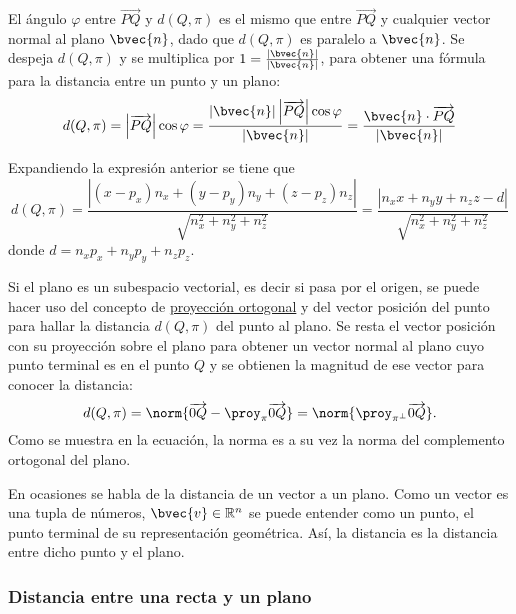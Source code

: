 \documentclass{fmbnotes}
\begin{document}
El ángulo \( \varphi \) entre \( \overrightarrow{P Q} \) y \( d(Q, \pi) \) es el mismo que entre \( \overrightarrow{P Q} \) y cualquier vector normal al plano \( \bvec{n} \), dado que \( d(Q, \pi) \) es paralelo a \( \bvec{n}  \). Se despeja \( d(Q, \pi) \) y se multiplica por \( 1=\frac{\left|\bvec{n}\right|}{\left|\bvec{n}\right|} \), para obtener una fórmula para la distancia entre un punto y un plano:
\[ d(Q, \pi)=\left|\overrightarrow{P Q}\right| \cos \varphi=\frac{\left|\bvec{n}\right|\left|\overrightarrow{P Q}\right| \cos \varphi}{\left|\bvec{n}\right|}=\frac{\bvec{n} \cdot \overrightarrow{P Q}}{\left|\bvec{n}\right|} \]

Expandiendo la expresión anterior se tiene que
\[ d(Q, \pi)=\frac{\left|\left(x-p_{x}\right) n_{x}+\left(y-p_{y}\right) n_{y}+\left(z-p_{z}\right) n_{z}\right|}{\sqrt{n_{x}^{2}+n_{y}^{2}+n_{z}^{2}}}=\frac{\left|n_{x} x+n_{y} y+n_{z} z-d\right|}{\sqrt{n_{x}^{2}+n_{y}^{2}+n_{z}^{2}}}\]
donde \(d=n_{x} p_{x}+n_{y} p_{y}+n_{z} p_{z} \).

Si el plano es un subespacio vectorial, es decir si pasa por el origen, se puede hacer uso del concepto de \hyperlink{def:proyeccion_ortogonal}{proyección ortogonal} y del vector posición del punto para hallar la distancia \(d(Q,\pi)\) del punto al plano. Se resta el vector posición con su proyección sobre el plano para obtener un vector normal al plano cuyo punto terminal es en el punto \(Q\) y se obtienen la magnitud de ese vector para conocer la distancia:
\[d(Q,\pi)=\norm{\overrightarrow{0Q}-\proy_{\pi}\overrightarrow{0Q}}=\norm{\proy_{\pi^\perp}\overrightarrow{0Q}}.\]
Como se muestra en la ecuación, la norma es a su vez la norma del complemento ortogonal del plano.


\begin{tip}
	En ocasiones se habla de la distancia de un vector a un plano. Como un vector es una tupla de números, \(\bvec{v}\in\mathbb{R}^{n}\) se puede entender como un punto, el punto terminal de su representación geométrica. Así, la distancia es la distancia entre dicho punto y el plano.  
\end{tip}

\subsubsection{ Distancia entre una recta y un plano}
\end{document}
